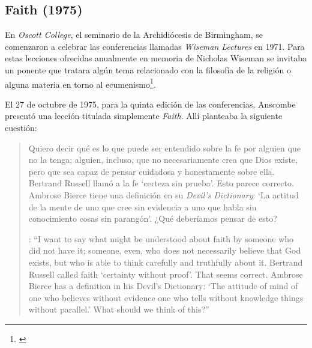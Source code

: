 \subsection{Faith (1975)}

En \emph{Oscott College}, el seminario de la Archidiócesis de Birmingham, se comenzaron a celebrar las conferencias llamadas \emph{Wiseman Lectures} en 1971. Para estas lecciones ofrecidas anualmente en memoria de Nicholas Wiseman se invitaba un ponente que tratara algún tema relacionado con la filosofía de la religión o alguna materia en torno al ecumenismo\footnote{\cite[Cf.~][7]{wisemanlects}}.

El 27 de octubre de 1975, para la quinta edición de las conferencias, Anscombe presentó una lección titulada simplemente \emph{Faith}. Allí planteaba la siguiente cuestión: \blockquote[{\cite[115]{anscombe1981erp:faith}}: \enquote{I want to say what might be understood about faith by someone who did not have it; someone, even, who does not necessarily believe that God exists, but who is able to think carefully and truthfully about it. Bertrand Russell called faith `certainty without proof'. That seems correct. Ambrose Bierce has a definition in his Devil's Dictionary: `The attitude of mind of one who believes without evidence one who tells without knowledge things without parallel.' What should we think of this?}]{Quiero decir qué es lo que puede ser entendido sobre la fe por alguien que no la tenga; alguien, incluso, que no necesariamente crea que Dios existe, pero que sea capaz de pensar cuidadosa y honestamente sobre ella. Bertrand Russell llamó a la fe `certeza sin prueba'. Esto parece correcto. Ambrose Bierce tiene una definición en su \emph{Devil's Dictionary}: `La actitud de la mente de uno que cree sin evidencia a uno que habla sin conocimiento cosas sin parangón'. ¿Qué deberíamos pensar de esto?}

